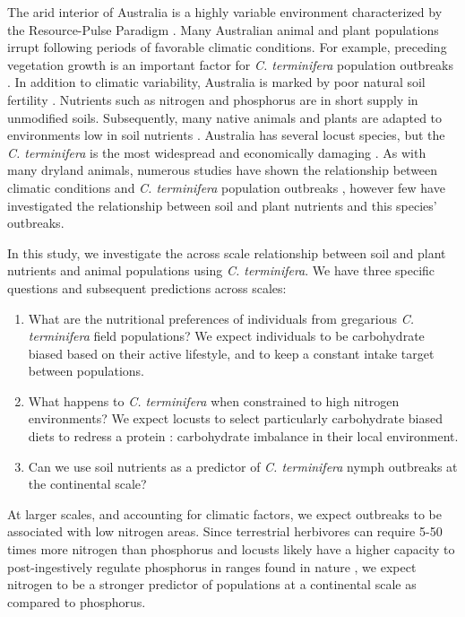\documentclass[
]{article}
\begin{document}
The arid interior of Australia is a highly variable environment
\citep{morton_fresh_2011} characterized by the Resource-Pulse Paradigm
\citep{noy-meir_desert_1974, whitford_ecology_2002}. Many Australian
animal and plant populations irrupt following periods of favorable
climatic conditions. For example, preceding vegetation growth is an
important factor for \emph{C. terminifera} population outbreaks
\citep{lawton_seeing_2022}. In addition to climatic variability,
Australia is marked by poor natural soil fertility
\citep{morton_fresh_2011, orians_ecology_2007}. Nutrients such as
nitrogen and phosphorus are in short supply in unmodified soils.
Subsequently, many native animals and plants are adapted to environments
low in soil nutrients \citep{orians_ecology_2007}. Australia has several
locust species, but the \emph{C. terminifera} is the most widespread and
economically damaging \citep{hunter_adaptations_2001}. As with many
dryland animals, numerous studies have shown the relationship between
climatic conditions and \emph{C. terminifera} population outbreaks
\citep{clark_influence_1974, deveson_not_2005, farrow_population_1982, key_general_1945},
however few have investigated the relationship between soil and plant
nutrients and this species' outbreaks.

In this study, we investigate the across scale relationship between soil
and plant nutrients and animal populations using \emph{C. terminifera}.
We have three specific questions and subsequent predictions across
scales:

\begin{enumerate}
\def\labelenumi{\arabic{enumi})}
\item
  What are the nutritional preferences of individuals from gregarious
  \emph{C. terminifera} field populations? We expect individuals to be
  carbohydrate biased based on their active lifestyle, and to keep a
  constant intake target between populations.
\item
  What happens to \emph{C. terminifera} when constrained to high
  nitrogen environments? We expect locusts to select particularly
  carbohydrate biased diets to redress a protein : carbohydrate
  imbalance in their local environment.
\item
  Can we use soil nutrients as a predictor of \emph{C. terminifera}
  nymph outbreaks at the continental scale?
\end{enumerate}

At larger scales, and accounting for climatic factors, we expect
outbreaks to be associated with low nitrogen areas. Since terrestrial
herbivores can require 5-50 times more nitrogen than phosphorus
\citep{elser_nutritional_2000} and locusts likely have a higher capacity
to post-ingestively regulate phosphorus in ranges found in nature
\citep{cease_dietary_2016, zhang_grasshoppers_2014}, we expect nitrogen
to be a stronger predictor of populations at a continental scale as
compared to phosphorus.
\end{document}
